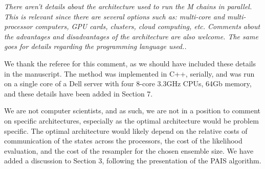 \documentclass{article}
\newcommand{\comment}[2]{\vspace{0.6cm}{\bf Comment:} {\it #1.}

\vspace{0.3cm}{\bf Answer:} #2}
\begin{document}
\comment{There aren't details about the architecture used to run the M chains in 
parallel. This is relevant since there are several options such as: multi-core 
and multi-processor computers, GPU cards, clusters, cloud computing, etc. 
Comments about the advantages and disadvantages of the architecture 
are also welcome. The same goes for details regarding the programming language 
used.}{We thank the referee for this comment, as we should have included these details in the manuscript. The method was implemented in C++, serially, and was run on a single core of a Dell server with four 8-core 3.3GHz CPUs, 64Gb memory, and these details have been added in Section 7. 

We are not computer scientists, and as such, we are not in a position to comment on specific architectures, especially as the optimal architecture would be problem specific. The optimal architecture would likely depend on the relative costs of communication of the states across the processors, the cost of the likelihood evaluation, and the cost of the resampler for the chosen ensemble size. We have added a discussion to Section 3, following the presentation of the PAIS algorithm.}%
\end{document}
